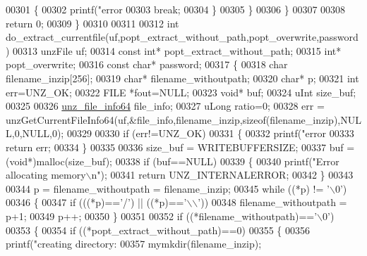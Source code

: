 \begin{DoxyCode}
{{{{{{{00301             \{
00302                 printf(\textcolor{stringliteral}{"error %
00303                 \textcolor{keywordflow}{break};
00304             \}
00305         \}
00306     \}
00307 
00308     \textcolor{keywordflow}{return} 0;
00309 \}
00310 
00311 
00312 \textcolor{keywordtype}{int} do\_extract\_currentfile(uf,popt\_extract\_without\_path,popt\_overwrite,password)
00313     unzFile uf;
00314     \textcolor{keyword}{const} \textcolor{keywordtype}{int}* popt\_extract\_without\_path;
00315     \textcolor{keywordtype}{int}* popt\_overwrite;
00316     \textcolor{keyword}{const} \textcolor{keywordtype}{char}* password;
00317 \{
00318     \textcolor{keywordtype}{char} filename\_inzip[256];
00319     \textcolor{keywordtype}{char}* filename\_withoutpath;
00320     \textcolor{keywordtype}{char}* p;
00321     \textcolor{keywordtype}{int} err=UNZ\_OK;
00322     FILE *fout=NULL;
00323     \textcolor{keywordtype}{void}* buf;
00324     uInt size\_buf;
00325 
00326     \hyperlink{structunz__file__info64__s}{unz\_file\_info64} file\_info;
00327     uLong ratio=0;
00328     err = unzGetCurrentFileInfo64(uf,&file\_info,filename\_inzip,\textcolor{keyword}{sizeof}(filename\_inzip),NULL,0,NULL,0);
00329 
00330     \textcolor{keywordflow}{if} (err!=UNZ\_OK)
00331     \{
00332         printf(\textcolor{stringliteral}{"error %
00333         \textcolor{keywordflow}{return} err;
00334     \}
00335 
00336     size\_buf = WRITEBUFFERSIZE;
00337     buf = (\textcolor{keywordtype}{void}*)malloc(size\_buf);
00338     \textcolor{keywordflow}{if} (buf==NULL)
00339     \{
00340         printf(\textcolor{stringliteral}{"Error allocating memory\(\backslash\)n"});
00341         \textcolor{keywordflow}{return} UNZ\_INTERNALERROR;
00342     \}
00343 
00344     p = filename\_withoutpath = filename\_inzip;
00345     \textcolor{keywordflow}{while} ((*p) != \textcolor{charliteral}{'\(\backslash\)0'})
00346     \{
00347         \textcolor{keywordflow}{if} (((*p)==\textcolor{charliteral}{'/'}) || ((*p)==\textcolor{charliteral}{'\(\backslash\)\(\backslash\)'}))
00348             filename\_withoutpath = p+1;
00349         p++;
00350     \}
00351 
00352     \textcolor{keywordflow}{if} ((*filename\_withoutpath)==\textcolor{charliteral}{'\(\backslash\)0'})
00353     \{
00354         \textcolor{keywordflow}{if} ((*popt\_extract\_without\_path)==0)
00355         \{
00356             printf(\textcolor{stringliteral}{"creating directory: %
00357             mymkdir(filename\_inzip);
}}}}}}}}}}
\end{DoxyCode}
